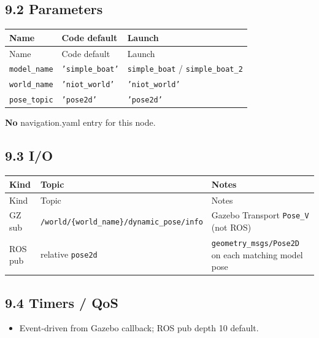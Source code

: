 \subsection{9.2 Parameters}


\begin{center}
\small
\begin{longtable}{@{}llp{7.2cm}@{}}
\toprule
Name & Code default & Launch \\
\midrule
\endfirsthead
\toprule
Name & Code default & Launch \\
\midrule
\endhead
\texttt{model\_name} & \texttt{'simple\_boat'} & \texttt{simple\_boat} / \texttt{simple\_boat\_2} \\
\texttt{world\_name} & \texttt{'niot\_world'} & \texttt{'niot\_world'} \\
\texttt{pose\_topic} & \texttt{'pose2d'} & \texttt{'pose2d'} \\
\bottomrule
\end{longtable}
\end{center}


\textbf{No} navigation.yaml entry for this node.


\subsection{9.3 I/O}


\begin{center}
\small
\begin{longtable}{@{}llp{7.2cm}@{}}
\toprule
Kind & Topic & Notes \\
\midrule
\endfirsthead
\toprule
Kind & Topic & Notes \\
\midrule
\endhead
GZ sub & \texttt{/world/\{world\_name\}/dynamic\_pose/info} & Gazebo Transport \texttt{Pose\_V} (not ROS) \\
ROS pub & relative \texttt{pose2d} & \texttt{geometry\_msgs/Pose2D} on each matching model pose \\
\bottomrule
\end{longtable}
\end{center}


\subsection{9.4 Timers / QoS}


\begin{itemize}[leftmargin=*]
\item Event-driven from Gazebo callback; ROS pub depth 10 default.
\end{itemize}


